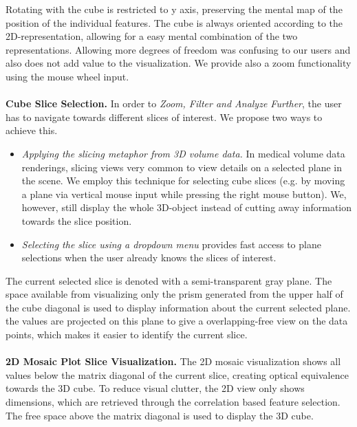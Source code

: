 \documentclass[journal]{style/vgtc} 			          %
\newcommand{\com}[1]{\textcolor{orange}{\uline{#1}}}
\begin{document}
Rotating with the cube is restricted to y axis, preserving the mental map of the position of the individual features.
The cube is always oriented according to the 2D-representation, allowing for a easy mental combination of the two representations.
Allowing more degrees of freedom was confusing to our users and also does not add value to the visualization.
We provide also a zoom functionality using the mouse wheel input.
\\\\
\textbf{Cube Slice Selection.}
In order to \emph{Zoom, Filter and Analyze Further}, the user has to navigate towards different slices of interest.
We propose two ways to achieve this.
\begin{itemize}
	\item \emph{Applying the slicing metaphor from 3D volume data.}
	In medical volume data renderings, slicing views very common to view details on a selected plane in the scene.
	We employ this technique for selecting cube slices (e.g. by moving a plane via vertical mouse input while pressing the right mouse button).
	We, however, still display the whole 3D-object instead of cutting away information towards the slice position.
	\item \emph{Selecting the slice using a dropdown menu} provides fast access to plane selections when the user already knows the slices of interest.
\end{itemize}
The current selected slice is denoted with a semi-transparent gray plane.
The space available from visualizing only the prism generated from the upper half of the cube diagonal is used to display information about the current selected plane.
the values are projected on this plane to give a overlapping-free view on the data points, which makes it easier to identify the current slice.
\\\\
\textbf{2D Mosaic Plot Slice Visualization.}
The 2D mosaic visualization shows all values below the matrix diagonal of the current slice, creating optical equivalence towards the 3D cube.
To reduce visual clutter, the 2D view only shows dimensions, which are retrieved through the correlation based feature selection.
The free space above the matrix diagonal is used to display the 3D cube.
\end{document}
